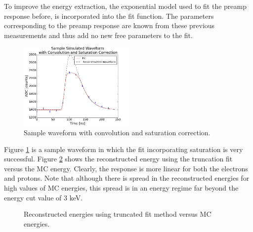 To improve the energy extraction, the exponential model used to fit the preamp response before, is incorporated into the fit function. The parameters corresponding to the preamp response are known from these previous measurements and thus add no new free parameters to the fit. 
\begin{figure}[htp!]
    \centering
    \includegraphics[width=0.5\textwidth]{Images2/recoSat.png}
    \caption{Sample waveform with convolution and saturation correction.}
    \label{fig:recoSat}
\end{figure} 

Figure \ref{fig:recoSat} is a sample waveform in which the fit incorporating saturation is very successful. Figure \ref{protonANDELectronWithTrunction} shows the reconstructed energy using the truncation fit versus the MC energy. Clearly, the response is more linear for both the electrons and protons. Note that although there is spread in the reconstructed energies for high values of MC energies, this spread is in an energy regime far beyond the energy cut value of 3 keV.

\begin{figure}[htp!]
    \centering
    \caption{Reconstructed energies using truncated fit method versus MC energies.}
    \label{protonANDELectronWithTrunction}
\end{figure} 


